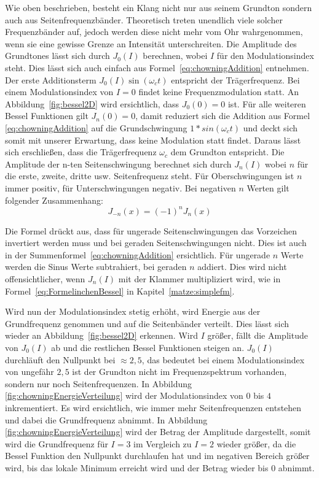 Wie oben beschrieben, besteht ein Klang nicht nur aus seinem Grundton sondern auch aus Seitenfrequenzbänder. Theoretisch treten unendlich viele solcher Frequenzbänder auf, jedoch werden diese nicht mehr vom Ohr wahrgenommen, wenn sie eine gewisse Grenze an Intensität unterschreiten. Die Amplitude des Grundtones lässt sich durch $J_0(I)$ berechnen, wobei $I$ für den Modulationsindex steht. Dies lässt sich auch einfach aus Formel~\ref{eq:chowningAddition} entnehmen. Der erste Additionsterm $J_0(I)\sin(\omega_c t)$ entspricht der Trägerfrequenz. Bei einem Modulationsindex von $I=0$ findet keine Frequenzmodulation statt. An Abbildung~\ref{fig:bessel2D} wird ersichtlich, dass $J_0(0)=0$ ist. Für alle weiteren Bessel Funktionen gilt $J_n(0)=0$, damit reduziert sich die Addition aus Formel~ \ref{eq:chowningAddition} auf die Grundschwingung $1*sin(\omega_c t)$ und deckt sich somit mit unserer Erwartung, dass keine Modulation statt findet. Daraus lässt sich erschließen, dass die Trägerfrequenz $\omega_c$ dem Grundton entspricht. Die Amplitude der n-ten Seitenschwingung berechnet sich durch $J_n(I)$ wobei $n$ für die erste, zweite, dritte usw. Seitenfrequenz steht. Für Oberschwingungen ist $n$ immer positiv, für Unterschwingungen negativ. Bei negativen $n$ Werten gilt folgender Zusammenhang: \cite[S. 223]{temme}
\begin{equation*}
J_{-n}(x)=(-1)^nJ_n(x)
\end{equation*}

Die Formel drückt aus, dass für ungerade Seitenschwingungen das Vorzeichen invertiert werden muss und bei geraden Seitenschwingungen nicht. Dies ist auch in der Summenformel~\ref{eq:chowningAddition} ersichtlich. Für ungerade $n$ Werte werden die Sinus Werte subtrahiert, bei geraden $n$ addiert. Dies wird nicht offensichtlicher, wenn $J_n(I)$ mit der Klammer multipliziert wird, wie in Formel~\ref{eq:FormelinchenBessel} in Kapitel~\ref{matze:simplefm}.

\label{bulli:besselModIndexZusammenahang}
Wird nun der Modulationsindex stetig erhöht, wird Energie aus der Grundfrequenz genommen und auf die Seitenbänder verteilt. Dies lässt sich wieder an Abbildung~\ref{fig:bessel2D} erkennen. Wird $I$ größer, fällt die Amplitude von $J_0(I)$ ab und die restlichen Bessel Funktionen steigen an. $J_0(I)$ durchläuft den Nullpunkt bei $\approx2,5$, das bedeutet bei einem Modulationsindex von ungefähr $2,5$ ist der Grundton nicht im Frequenzspektrum vorhanden, sondern nur noch Seitenfrequenzen. In Abbildung~ \ref{fig:chowningEnergieVerteilung} wird der Modulationsindex von $0$ bis $4$ inkrementiert. Es wird ersichtlich, wie immer mehr Seitenfrequenzen entstehen und dabei die Grundfrequenz abnimmt. In Abbildung~ \ref{fig:chowningEnergieVerteilung} wird der Betrag der Amplitude dargestellt, somit wird die Grundfrequenz für $I=3$ im Vergleich zu $I=2$ wieder größer, da die Bessel Funktion den Nullpunkt durchlaufen hat und im negativen Bereich größer wird, bis das lokale Minimum erreicht wird und der Betrag wieder bis $0$ abnimmt.

